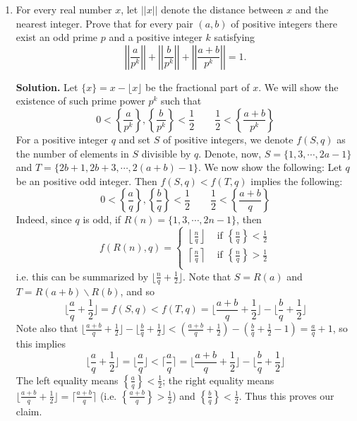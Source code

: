 \documentclass[11pt,a4paper]{article}
\begin{document}
\begin{enumerate}
	\item[\textbf{N8}]
	For every real number $x$, let $||x||$ denote the distance between $x$ and the nearest integer.
	Prove that for every pair $(a, b)$ of positive integers there exist an odd prime $p$ and a positive integer $k$ satisfying\[\displaystyle\left|\left|\frac{a}{p^k}\right|\right|+\left|\left|\frac{b}{p^k}\right|\right|+\left|\left|\frac{a+b}{p^k}\right|\right|=1.\]
	
	\textbf{Solution.}
	Let $\{x\} = x - \lfloor x\rfloor$ be the fractional part of $x$. 
	We will show the existence of such prime power $p^k$ such that 
	\[
	0 < \left\{\frac{a}{p^k}\right\}, \left\{\frac{b}{p^k}\right\} < \frac 12 
	\qquad 
	\frac 12 < \left\{\frac{a + b}{p^k}\right\}
	\]
	For a positive integer $q$ and set $S$ of positive integers, we denote $f(S, q)$ as the number of elements in $S$ divisible by $q$. 
	Denote, now, $S = \{1, 3, \cdots, 2a - 1\}$ and $T = \{2b + 1, 2b + 3, \cdots, 2(a + b) - 1\}$. 
	We now show the following: 
	Let $q$ be an positive odd integer. Then $f(S, q) < f(T, q)$ implies the following: 
	\[
	0 < \left\{\frac{a}{q}\right\}, \left\{\frac{b}{q}\right\} < \frac 12 
	\qquad 
	\frac 12 < \left\{\frac{a + b}{q}\right\}
	\]
	Indeed, since $q$ is odd, if $R(n) = \{1, 3, \cdots, 2n - 1\}$, then 
	\[
	f(R(n), q) =
	\begin{cases}
		\left\lfloor \frac{n}{q}\right\rfloor & \text{ if }\left\{\frac{n}{q}\right\} < \frac 12\\
		\left\lceil \frac{n}{q}\right\rceil & \text{ if }\left\{\frac{n}{q}\right\} > \frac 12\\
	\end{cases}
	\]
	i.e. this can be summarized by 
	$\lfloor \frac{n}{q} + \frac 12\rfloor$. 
	Note that $S=R(a)$ and $T = R(a + b)\backslash R(b)$, and so 
	\[
	\lfloor \frac{a}{q} + \frac 12\rfloor = f(S, q) < f(T, q) = \lfloor \frac{a + b}{q} + \frac 12\rfloor  - \lfloor \frac{b}{q} + \frac 12\rfloor 
	\]
	Note also that 
	$\lfloor \frac{a + b}{q} + \frac 12\rfloor  - \lfloor \frac{b}{q} + \frac 12\rfloor  < 
	(\frac{a + b}{q} + \frac 12) - (\frac{b}{q} + \frac 12 - 1)
	=\frac{a}{q}+ 1$, 
	so this implies 
	\[
	\lfloor \frac{a}{q} + \frac 12\rfloor  = \lfloor \frac{a}{q} \rfloor < \lceil \frac{a}{q}\rceil = \lfloor \frac{a + b}{q} + \frac 12\rfloor  - \lfloor \frac{b}{q} + \frac 12\rfloor 
	\]
	The left equality means $\left\{\frac{a}{q}\right\} < \frac 12$; 
	the right equality means $\lfloor \frac{a + b}{q} + \frac 12\rfloor=\lceil\frac{a + b}{q} \rceil$ (i.e. $\left\{\frac{a + b}{q}\right\} > \frac 12$)
	and $\left\{\frac{b}{q}\right\} < \frac 12$. 
	Thus this proves our claim. 
	

\end{enumerate}
\end{document}
